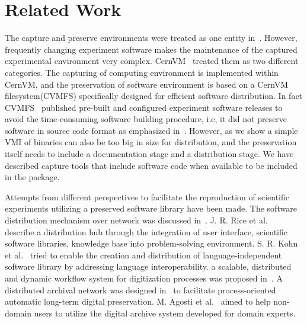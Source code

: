 \section{Related Work}

The capture and preserve environments were treated as one entity in~\cite{matthews2009towards,hong2010software}. 
However, frequently changing experiment software makes the maintenance of the captured experimental environment very complex. 
CernVM~\cite{buncic2010cernvm} treated them as two different categories. 
The capturing of computing environment is implemented within CernVM, and the preservation of software environment is based on a CernVM filesystem(CVMFS) specifically designed for efficient software distribution.
In fact CVMFS~\cite{buncic2010cernvm} published pre-built and configured experiment software releases to avoid the time-consuming software building procedure, i.e, it did not 
preserve software in source code format as emphasized in~\cite{zabolitzky2002preserving,castagne2013consider}. 
However, as we show a simple VMI of binaries can also be too big in size for distribution, and the preservation itself needs to include a documentation stage and a distribution stage. 
We have described capture tools that include software code when available to be included in the package. 

Attempts from different perspectives to facilitate the reproduction of scientific experiments utilizing a preserved software library have been made. 
The software distribution mechanism over network was discussed in~\cite{compostella2010cdf, blomer2011cernvm}.
J. R. Rice et al.~\cite{rice1996scientific} describe a distribution hub through the integration of user interface, scientific software libraries, knowledge base into problem-solving environment.
S. R. Kohn et al.~\cite{kohn2001divorcing} tried to enable the creation and distribution of language-independent software library by addressing language interoperability.
a scalable, distributed and dynamic workflow system for digitization processes was proposed in~\cite{schoneberg2013scalable}.
A distributed archival network was designed in~\cite{subotic2013distributed} to facilitate process-oriented automatic long-term digital preservation.
M. Agosti et al.~\cite{agosti2012envisage} aimed to help non-domain users to utilize the digital archive system developed for domain experts.

